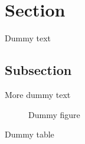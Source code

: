 \documentclass{article}
\begin{document}
\tableofcontents
\newpage

\section{Section}

Dummy text

\subsection{Subsection}

More dummy text

\begin{figure}
  \caption{Dummy figure}
\end{figure}

\begin{table}
  \caption{Dummy table}
\end{table}

\newpage
\begin{appendix}
  \listoffigures
  \listoftables
\end{appendix}
\end{document}

